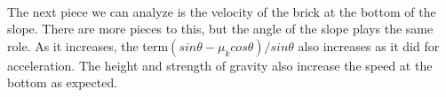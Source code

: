 \documentclass[11pt,a4paper]{report}
\begin{document}
\paragraph{}The next piece we can analyze is the velocity of the brick at the bottom of the slope. There are more pieces to this, but the angle of the slope plays the same role. As it increases, the term$(sin\theta-\mu_kcos\theta)/sin\theta$ also increases as it did for acceleration. The height and strength of gravity also increase the speed at the bottom as expected.
\end{document}
